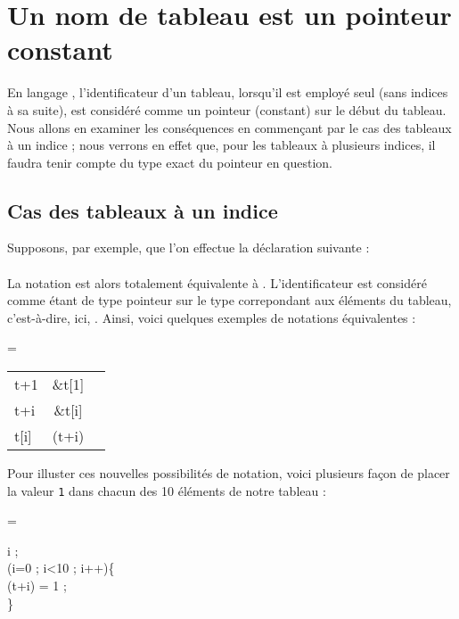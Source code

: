 \documentclass[a4paper]{report}
\newenvironment{code}
{
	\vspace*{0.5cm}
		\begin{mdframed}[backgroundcolor=lightgray]
    	\begin{minipage}[b]{\textwidth}\parindent=\oldparindent

      		\linenumbers
      		\asciifamily 	
}
{
	
	\end{minipage}
	\normalfont
	\end{mdframed}
	\vspace*{0.5cm}
}
\newcommand{\bleu}[1]{\textbf {\color{bbleu}\asciifamily{#1}}}
\newcommand{\vertt}[1]{\textbf {\color{vvert}\asciifamily{#1}}}
\newcommand{\noirr}[1]{\textbf {\color{nnoir}\asciifamily{#1}}}
\newcommand{\iin}{\indent}
\newcommand{\ii}{\indent\indent}
\begin{document}
		\section{Un nom de tableau est un pointeur constant}

			En langage \noirr{C}, l’identificateur d’un tableau, lorsqu’il est employé seul (sans indices à sa suite), est considéré comme un pointeur (constant) sur le début du tableau. Nous allons en examiner les conséquences en commençant par le cas des tableaux à un indice ; nous verrons en effet que, pour les tableaux à plusieurs indices, il faudra tenir compte du type exact du pointeur en question.

			\subsection{Cas des tableaux à un indice}
				Supposons, par exemple, que l’on effectue la déclaration suivante :\\ 
				\bleu{int} \noirr{t[10]}\\
				La notation  \noirr{t} est alors totalement équivalente à \noirr{\&t[0]}.
				L'identificateur \noirr{t} est considéré comme étant de type pointeur sur le type correpondant aux éléments du tableau, c'est-à-dire, ici, \bleu{int} \bleu{*}. Ainsi, voici quelques exemples de notations équivalentes : 
				

				\begin{code}
					\begin{tabular}{ l c r }
  						 t+1 & \ii\&t[1]\\
  						 t+i & \ii\&t[i]\\
						 t[i]& \ii* (t+i)\\
					\end{tabular}
				\end{code}
				Pour illuster ces nouvelles possibilités de notation, voici plusieurs façon de placer la valeur \verb+1+ dans chacun des 10 éléments de notre tableau \noirr{t} : 
				\par\begin{code}
					\iin\bleu{int} i ; \\
					\iin\vertt{for} (i=0 ; i<10 ; i++)\{\\
						\ii* (t+i) = 1 ;\\
					\iin\}

				\end{code}
\end{document}
